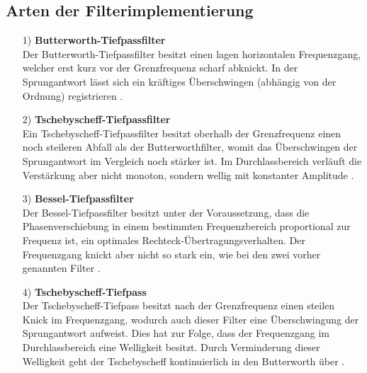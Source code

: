 \subsection*{Arten der Filterimplementierung}
\begin{itemize}
    \item[1)]\textbf{Butterworth-Tiefpassfilter}\\
    Der Butterworth-Tiefpassfilter besitzt einen lagen horizontalen Frequenzgang, welcher erst kurz vor der Grenzfrequenz scharf abknickt. In der Sprungantwort lässt sich ein kräftiges Überschwingen (abhängig von der Ordnung) registrieren \citep{VA}.
    \item[2)]\textbf{Tschebyscheff-Tiefpassfilter}\\
    Ein Tschebyscheff-Tiefpassfilter besitzt oberhalb der Grenzfrequenz einen noch steileren Abfall als der Butterworthfilter, womit das Überschwingen der Sprungantwort im Vergleich noch stärker ist. Im Durchlassbereich verläuft die Verstärkung aber nicht monoton, sondern wellig mit konstanter Amplitude \citep{VA}.
    \item[3)]\textbf{Bessel-Tiefpassfilter}\\
    Der Bessel-Tiefpassfilter besitzt unter der Voraussetzung, dass die Phasenverschiebung in einem bestimmten Frequenzbereich proportional zur Frequenz ist, ein optimales Rechteck-Übertragungsverhalten. Der Frequenzgang knickt aber nicht so stark ein, wie bei den zwei vorher genannten Filter \citep{VA}.
    \item[4)]\textbf{Tschebyscheff-Tiefpass}\\
    Der Tschebyscheff-Tiefpass besitzt nach der Grenzfrequenz einen steilen Knick im Frequenzgang, wodurch auch dieser Filter eine Überschwingung der Sprungantwort aufweist. Dies hat zur Folge, dass der Frequenzgang im Durchlassbereich eine Welligkeit besitzt. Durch Verminderung dieser Welligkeit geht der Tschebyscheff kontinuierlich in den Butterworth über \citep{VA}. 
\end{itemize}

